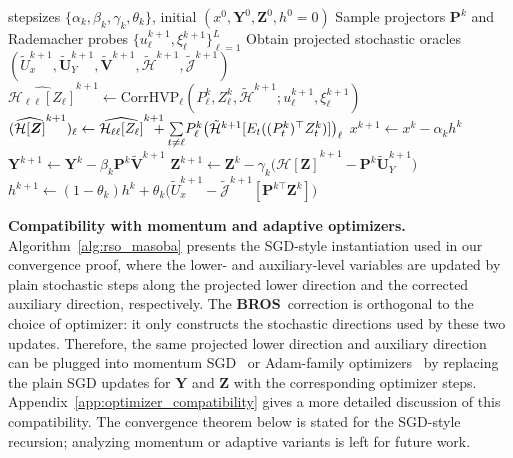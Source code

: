 \documentclass{pkumelon}
\theoremstyle{plain}
\newcommand{\oursname}{\textnormal{\textbf{BROS}}}
\newcommand{\ours}{\oursname\ }
\newcommand{\ourslast}{\oursname}
\begin{document}
\begin{algorithm}[H]
\caption{\ourslast}
\label{alg:rso_masoba}
\small
\begin{algorithmic}[1]
\Require stepsizes $\{\alpha_k,\beta_k,\gamma_k,\theta_k\}$, initial $(x^0,\boldsymbol Y^0,\boldsymbol Z^0,h^0=0)$
    \State Sample projectors $\boldsymbol P^k$ and Rademacher probes $\{u_\ell^{k+1},\xi_\ell^{k+1}\}_{\ell=1}^L$
    \State Obtain projected stochastic oracles $(\tilde U_x^{k+1},\tilde{\boldsymbol U}_Y^{k+1},\tilde{\boldsymbol V}^{k+1},\tilde{\mathcal H}^{k+1},\tilde{\mathcal J}^{k+1})$
        \State $\widehat{\mathcal H_{\ell\ell}[Z_\ell]}^{k+1}\gets \mathrm{CorrHVP}_\ell\!\left(P_\ell^k,Z_\ell^k,\tilde{\mathcal H}^{k+1};u_\ell^{k+1},\xi_\ell^{k+1}\right)$ 
        \State $(\widehat{\mathcal H[\boldsymbol Z]}^{k+1})_\ell\gets \widehat{\mathcal H_{\ell\ell}[Z_\ell]}^{k+1}\hspace{-1em}+\underset{t\ne\ell}{\sum}P_\ell^k\bigl(\tilde{\mathcal H}^{k+1}[E_t((P_t^k)^\top Z_t^k)]\bigr)_\ell$ 
    \EndFor
    \State $x^{k+1}\gets x^k-\alpha_k h^k$ 
    \State $\boldsymbol Y^{k+1}\gets \boldsymbol Y^k-\beta_k\boldsymbol P^k\tilde{\boldsymbol V}^{k+1}$ 
    \State $\boldsymbol Z^{k+1}\gets \boldsymbol Z^k-\gamma_k\bigl(\widehat{\mathcal H[\boldsymbol Z]}^{k+1}-\boldsymbol P^k\tilde{\boldsymbol U}_Y^{k+1}\bigr)$ 
    \State $h^{k+1}\gets (1-\theta_k)h^k+\theta_k\bigl(\tilde U_x^{k+1}-\tilde{\mathcal J}^{k+1}[\boldsymbol P^{k\top}\boldsymbol Z^k]\bigr)$ 
\EndFor
\end{algorithmic}
\end{algorithm}

\textbf{Compatibility with momentum and adaptive optimizers.}
Algorithm~\ref{alg:rso_masoba} presents the SGD-style instantiation used in our convergence proof, where the lower- and auxiliary-level variables are updated by plain stochastic steps along the projected lower direction and the corrected auxiliary direction, respectively. The \ours correction is orthogonal to the choice of optimizer: it only constructs the stochastic directions used by these two updates. Therefore, the same projected lower direction and auxiliary direction can be plugged into momentum SGD~\cite{sutskever2013importance} or Adam-family optimizers~\cite{kingma2014adam,guo2021novel} by replacing the plain SGD updates for $\boldsymbol Y$ and $\boldsymbol Z$ with the corresponding optimizer steps. Appendix~\ref{app:optimizer_compatibility} gives a more detailed discussion of this compatibility. The convergence theorem below is stated for the SGD-style recursion; analyzing momentum or adaptive variants is left for future work.
\end{document}
